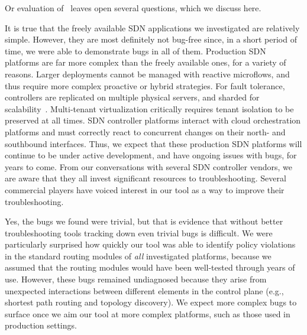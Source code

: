 Or evaluation of \simulator~leaves open several questions, which we discuss
here. 

It is true that the freely available SDN applications we investigated are relatively simple. However, they
are most definitely not bug-free since, in a short period of time, we were able to demonstrate bugs in all of them. 
Production SDN platforms are far more complex than the freely available ones, for a variety of reasons. Larger deployments cannot be managed with reactive microflows, and thus
require more complex proactive or hybrid strategies. For fault tolerance,
controllers are replicated on multiple physical servers, and sharded for
scalability~\cite{onix}. Multi-tenant virtualization critically requires tenant
isolation to be preserved at all times. SDN controller platforms interact with
cloud orchestration platforms and must correctly react to concurrent changes on
their north- and southbound interfaces. Thus, we expect that these production SDN platforms will continue
to be under active development, and have ongoing issues with bugs, for years to come. From our conversations with several SDN
controller vendors, we are aware that they all invest significant resources to troubleshooting. Several commercial players have voiced
interest in our tool as a way to improve their troubleshooting. 

 Yes, the bugs we found were trivial, but that
is evidence that without better troubleshooting tools tracking down even trivial bugs is difficult.
We were particularly
surprised how quickly our tool was able to identify policy violations in the
standard routing modules of \emph{all} investigated platforms, because we assumed that the routing modules would have been well-tested
through years of use. However, these bugs remained undiagnosed because they arise from
unexpected interactions between different elements in the control plane (e.g.,
shortest path routing and topology discovery). We expect more complex bugs to
surface once we aim our tool at more complex platforms, such as those used in production settings.

